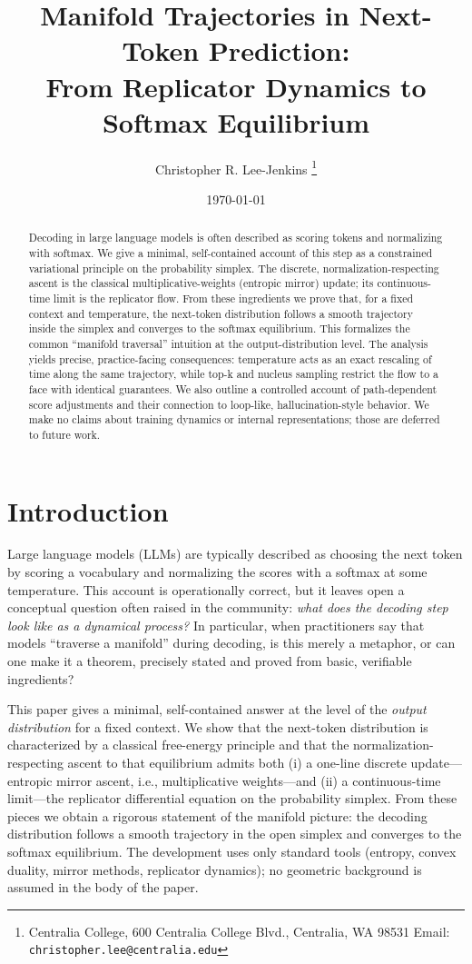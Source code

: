 \documentclass[11pt,reqno]{article}
\title{Manifold Trajectories in Next-Token Prediction: \\ From Replicator Dynamics to Softmax Equilibrium}
\author{Christopher R. Lee-Jenkins  \thanks{Centralia College,  600 Centralia College Blvd., Centralia, WA 98531 Email: \texttt{christopher.lee@centralia.edu}}}
\date{\today}
\numberwithin{equation}{section}
\theoremstyle{plain}
\theoremstyle{definition}
\theoremstyle{remark}
\newcommand{\1}{\mathbbm{1}}
\begin{document}
\maketitle

\begin{abstract}
Decoding in large language models is often described as scoring tokens and normalizing with softmax. We give a minimal, self-contained account of this step as a constrained variational principle on the probability simplex. The discrete, normalization-respecting ascent is the classical multiplicative-weights (entropic mirror) update; its continuous-time limit is the replicator flow. From these ingredients we prove that, for a fixed context and temperature, the next-token distribution follows a smooth trajectory inside the simplex and converges to the softmax equilibrium. This formalizes the common “manifold traversal” intuition at the output-distribution level. The analysis yields precise, practice-facing consequences: temperature acts as an exact rescaling of time along the same trajectory, while top-k and nucleus sampling restrict the flow to a face with identical guarantees. We also outline a controlled account of path-dependent score adjustments and their connection to loop-like, hallucination-style behavior. We make no claims about training dynamics or internal representations; those are deferred to future work.
\end{abstract}

\section{Introduction}

Large language models (LLMs) are typically described as choosing the next token by
scoring a vocabulary and normalizing the scores with a softmax at some temperature.
This account is operationally correct, but it leaves open a conceptual question often
raised in the community: \emph{what does the decoding step look like as a dynamical process?}
In particular, when practitioners say that models ``traverse a manifold'' during decoding,
is this merely a metaphor, or can one make it a theorem, precisely stated and proved from
basic, verifiable ingredients?

This paper gives a minimal, self-contained answer at the level of the \emph{output distribution}
for a fixed context. We show that the next-token distribution is characterized by a classical
free-energy principle and that the normalization-respecting ascent to that equilibrium admits
both (i) a one-line discrete update—entropic mirror ascent, i.e., multiplicative weights—and
(ii) a continuous-time limit—the replicator differential equation on the probability simplex.
From these pieces we obtain a rigorous statement of the manifold picture: the decoding
distribution follows a smooth trajectory in the open simplex and converges to the softmax
equilibrium. The development uses only standard tools (entropy, convex duality, mirror
methods, replicator dynamics); no geometric background is
assumed in the body of the paper.
\end{document}
